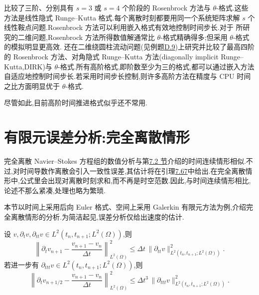 \begin{note}[高阶方法]
\label{note:time-dependent-higher-order-schemes}
\textcite{JohnMatthiesRang2006a} 比较了三阶、分别具有 $s=3$ 或 $s=4$ 个阶段的 Rosenbrock 方法与 $\theta$-格式.这些方法是线性隐式 Runge--Kutta 格式.每个离散时刻都要用同一个系统矩阵求解 $s$ 个线性鞍点问题.Rosenbrock 方法可以利用嵌入格式有效地控制时间步长.对于\textcite{JohnMatthiesRang2006a} 所研究的二维问题,Rosenbrock 方法所得数值解通常比 $\theta$-格式精确得多;但采用 $\theta$-格式的模拟明显更高效.\textcite{JohnRang2010} 还在二维绕圆柱流动问题(见例题\hyperref[ex:appendix-d-9]{D.9})上研究并比较了最高四阶的 Rosenbrock 方法、对角隐式 Runge--Kutta 方法(diagonally implicit Runge--Kutta,DIRK)与 $\theta$-格式.所有高阶格式,即阶数至少为三的格式,都可以通过嵌入方法自适应地控制时间步长.若采用时间步长控制,则许多高阶方法在精度与 CPU 时间之比方面明显优于 $\theta$-格式.

尽管如此,目前高阶时间推进格式似乎还不常用.
\end{note}

\section{有限元误差分析:完全离散情形}\label{sec:time-dependent-fem-fully-discrete}

\begin{note}[与时间连续情形的比较及本节内容]
\label{note:fully-discrete-error-analysis-content}
完全离散 Navier--Stokes 方程组的数值分析与第\hyperref[sec:time-dependent-fem-continuous]{7.2 节}介绍的时间连续情形相似.不过,对时间导数作离散会引入一致性误差,其估计将在引理\hyperref[lem:temporal-derivative-consistency]{7.67}中给出.在完全离散情形中,公式里会出现对离散时刻求和,而不再是时空范数.因此,与时间连续情形相比,论述不那么紧凑,处理也略为繁琐.

本节以时间上采用后向 Euler 格式、空间上采用 Galerkin 有限元方法为例,介绍完全离散情形的分析.为简洁起见,误差分析仅给出速度的估计.
\end{note}

\begin{lemma}[时间导数离散的一致性误差]
\label{lem:temporal-derivative-consistency}
设 $v,\partial_t v,\partial_{tt}v\in L^2(t_n,t_{n+1};L^2(\Omega))$,则
\begin{equation}\label{eq:backward-difference-consistency}
  \left\|\partial_t v_{n+1}
      -\frac{v_{n+1}-v_n}{\Delta t}\right\|_{L^2(\Omega)}^2
   \le \Delta t\,\|\partial_{tt}v\|_{L^2(t_n,t_{n+1};L^2(\Omega))}^2.
\end{equation}
若进一步有 $\partial_{ttt}v\in L^2(t_n,t_{n+1};L^2(\Omega))$,则
\begin{equation}\label{eq:midpoint-difference-consistency}
  \left\|\partial_t v_{n+1/2}
      -\frac{v_{n+1}-v_n}{\Delta t}\right\|_{L^2(\Omega)}^2
   \le \Delta t^3\,\|\partial_{ttt}v\|_{L^2(t_n,t_{n+1};L^2(\Omega))}^2.
\end{equation}
\end{lemma}

